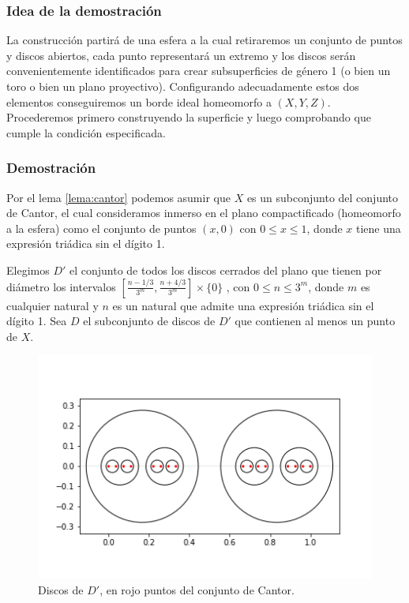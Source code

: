 \documentclass[a4paper,11pt,spanish, twoside, leqno]{tfg-uam}
\theoremstyle{definition}
\begin{document}
\subsubsection*{Idea de la demostración}
La construcción partirá de una esfera a la cual retiraremos un conjunto de puntos y discos abiertos, cada punto representará un extremo y los discos serán convenientemente identificados para crear  subsuperficies de género 1 (o bien un toro o bien un plano proyectivo). Configurando adecuadamente estos dos elementos conseguiremos un borde ideal homeomorfo a $(X,Y,Z)$.\\
Procederemos primero construyendo la superficie y luego comprobando que cumple la condición especificada.


\subsubsection*{Demostración}
Por el lema \ref{lema:cantor} podemos asumir que $X$ es un subconjunto del conjunto de Cantor, el cual consideramos inmerso en el plano compactificado (homeomorfo a la esfera) como el conjunto de puntos $(x,0)$ con $0 \leq x\leq 1$, donde $x$ tiene una expresión triádica sin el dígito 1.


Elegimos $D'$ el conjunto de todos los discos cerrados del plano que tienen por diámetro los intervalos $[\frac{n - 1/3}{3^m} , \frac{n + 4/3}{3^m} ] \times \{0\}$ , con $0\leq n \leq 3^m$, donde $m$ es cualquier natural y $n$ es un natural que admite una expresión triádica sin el dígito 1. Sea $D$ el subconjunto de discos de $D'$ que contienen al menos un punto de $X$.\\


\begin{figure}[h!]
	\centering
	\includegraphics[width=0.5\linewidth]{imagenes/conjuntoD.png}
	\caption{Discos de $D'$, en rojo puntos del conjunto de Cantor.}
	\label{fig:conjuntoD}
\end{figure}
\end{document}
